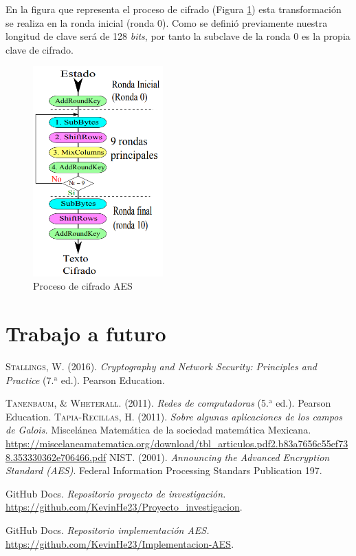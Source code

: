 \documentclass[peerreview]{IEEEtran}
\begin{document}
En la figura que representa el proceso de cifrado (Figura \ref{fig: 7}) esta transformación se realiza en la ronda inicial (ronda 0). Como se definió previamente nuestra longitud de clave será de 128 \textit{bits}, por tanto la subclave de la ronda 0 es la propia clave de cifrado.
\begin{figure}[H]
\includegraphics[width=5cm]{figuras/Diagrama1.png}
\centering
\caption{Proceso de cifrado AES}
\label{fig: 7}
\end{figure}
 


\section{Trabajo a futuro}

\begin{thebibliography}{1}
 \textsc{Stallings, W.} (2016). \textit{Cryptography and Network Security: Principles and Practice} (7.$^{\text{a}}$ ed.). Pearson Education.

 \textsc{Tanenbaum, \& Wheterall.} (2011). \textit{Redes de computadoras} (5.$^{\text{a}}$ ed.). Pearson Education.
\textsc{Tapia-Recillas, H.} (2011). \textit{Sobre algunas aplicaciones de los campos de Galois.} Miscelánea Matemática de la sociedad matemática Mexicana. \url{https://miscelaneamatematica.org/download/tbl_articulos.pdf2.b83a7656c55ef738.353330362e706466.pdf}
 \textsc{NIST}. (2001). \textit{Announcing the Advanced Encryption Standard (AES)}. Federal Information Processing Standars Publication 197.

 GitHub Docs.\textit{ Repositorio proyecto de investigación.} \url{https://github.com/KevinHe23/Proyecto_investigacion}.

 GitHub Docs.\textit{ Repositorio implementación AES.} \url{https://github.com/KevinHe23/Implementacion-AES}.
\end{thebibliography}
\end{document}

